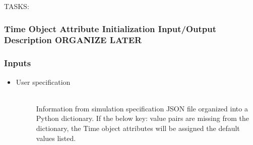 \documentclass[cleanfoot]{asme2ej}
\begin{document}
TASKS:

\label{sec:time}
\subsubsection{Time Object Attribute Initialization Input/Output Description ORGANIZE LATER}

\subsubsection*{Inputs}
\begin{itemize}
    \item
    \begin{description}
        \item[User specification] \hfill \\
        Information from simulation specification JSON file organized into a Python dictionary. If the below key: value pairs are missing from the dictionary, the Time object attributes will be assigned the default values listed.
    \end{description}
\end{itemize}
\end{document}
